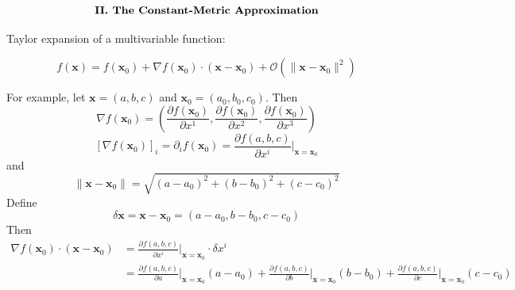 \documentclass[english]{article}
\begin{document}
\Needspace{110pt}\par\addvspace{20pt}\noindent\begin{minipage}{\linewidth}\begingroup\fontsize{12}{15}\selectfont\setlength{\abovedisplayskip}{0pt}\setlength{\belowdisplayskip}{0pt}\setlength{\abovedisplayshortskip}{0pt}\setlength{\belowdisplayshortskip}{0pt}
\[
\text{\bfseries II. The Constant-Metric Approximation}
\]
\endgroup\end{minipage}\par\nopagebreak[4]\vspace{20pt}\nopagebreak[4]

Taylor expansion of a multivariable function:

\[
f\left(\boldsymbol{x}\right)=f\left(\boldsymbol{x}_{0}\right)+\nabla f\left(\boldsymbol{x}_{0}\right)\cdot\left(\boldsymbol{x}-\boldsymbol{x}_{0}\right)+\mathcal{O}\left(\|\boldsymbol{x}-\boldsymbol{x}_{0}\|^{2}\right)
\]

For example, let $\boldsymbol{x}=\left(a,b,c\right)$ and $\boldsymbol{x}_{0}=\left(a_{0},b_{0},c_{0}\right)$.
Then 
\[
\nabla f\left(\boldsymbol{x}_{0}\right)=\left(\frac{\partial f\left(\boldsymbol{x}_{0}\right)}{\partial x^{1}},\frac{\partial f\left(\boldsymbol{x}_{0}\right)}{\partial x^{2}},\frac{\partial f\left(\boldsymbol{x}_{0}\right)}{\partial x^{3}}\right)
\]
 {}
\[
\left[\nabla f\left(\boldsymbol{x}_{0}\right)\right]_{i}=\partial_{i}f\left(\boldsymbol{x}_{0}\right)=\frac{\partial f\left(a,b,c\right)}{\partial x^{i}}\Bigg|_{\boldsymbol{x}=\boldsymbol{x}_{0}}
\]
 and 
\[
\|\boldsymbol{x}-\boldsymbol{x}_{0}\|=\sqrt{\left(a-a_{0}\right)^{2}+\left(b-b_{0}\right)^{2}+\left(c-c_{0}\right)^{2}}
\]
 Define 
\[
\delta\boldsymbol{x}=\boldsymbol{x}-\boldsymbol{x}_{0}=\left(a-a_{0},b-b_{0},c-c_{0}\right)
\]
 Then 
\begin{align*}
\nabla f\left(\boldsymbol{x}_{0}\right)\cdot\left(\boldsymbol{x}-\boldsymbol{x}_{0}\right) & =\frac{\partial f\left(a,b,c\right)}{\partial x^{i}}\Bigg|_{\boldsymbol{x}=\boldsymbol{x}_{0}}\cdot\delta x^{i}\\
 & =\frac{\partial f\left(a,b,c\right)}{\partial a}\Bigg|_{\boldsymbol{x}=\boldsymbol{x}_{0}}\left(a-a_{0}\right)+\frac{\partial f\left(a,b,c\right)}{\partial b}\Bigg|_{\boldsymbol{x}=\boldsymbol{x}_{0}}\left(b-b_{0}\right)+\frac{\partial f\left(a,b,c\right)}{\partial c}\Bigg|_{\boldsymbol{x}=\boldsymbol{x}_{0}}\left(c-c_{0}\right)
\end{align*}
\end{document}
